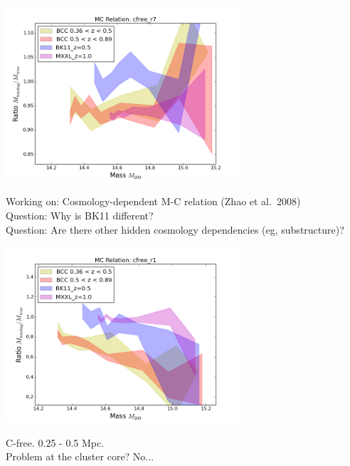 \documentclass{beamer}
\begin{document}

\begin{frame}
\centering

\includegraphics[width=0.65\textwidth]{../figures/cfree_r7}

{\small
Working on: Cosmology-dependent M-C relation (Zhao et al.\ 2008)\\
Question: Why is BK11 different?\\
Question: Are there other hidden cosmology dependencies (eg, substructure)?
}

\end{frame}


\begin{frame}

\centering

\includegraphics[width=0.65\textwidth]{../figures/cfree_r1}

\small{
C-free. 0.25 - 0.5 Mpc. \\


Problem at the cluster core? No...
}

\end{frame}

\end{document}
